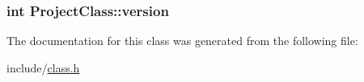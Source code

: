 \subsubsection[{\texorpdfstring{version}{version}}]{\setlength{\rightskip}{0pt plus 5cm}int Project\+Class\+::version}\hypertarget{class_project_class_a6fd99e189467e273cb558bec34098936}{}\label{class_project_class_a6fd99e189467e273cb558bec34098936}


The documentation for this class was generated from the following file\+:\begin{DoxyCompactItemize}
\item 
include/\hyperlink{class_8h}{class.\+h}\end{DoxyCompactItemize}
